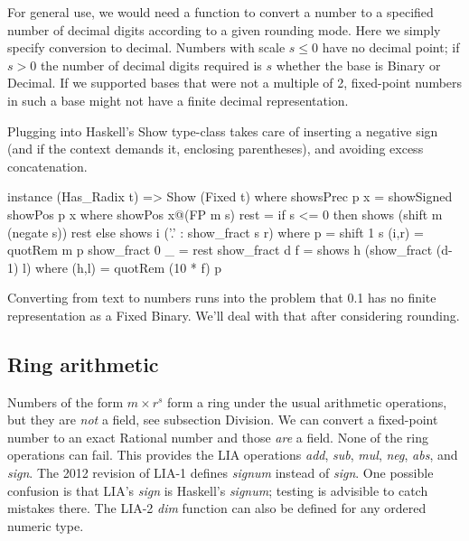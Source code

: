 \documentclass{article}
\begin{document}
For general use, we would need a function to convert a
number to a specified number of decimal digits according
to a given rounding mode.  Here we simply specify conversion
to decimal.  Numbers with scale $s \le 0$ have no decimal
point; if $s > 0$ the number of decimal digits required is
$s$ whether the base is Binary or Decimal.  If we supported
bases that were not a multiple of 2, fixed-point numbers in
such a base might not have a finite decimal representation.

Plugging into Haskell's Show type-class takes care of
inserting a negative sign (and if the context demands it,
enclosing parentheses), and avoiding excess concatenation.

\begin{code}
instance (Has_Radix t) => Show (Fixed t)
  where
    showsPrec p x = showSigned showPos p x
      where showPos x@(FP m s) rest =
              if s <= 0 then shows (shift m (negate s)) rest
              else shows i ('.' : show_fract s r)
              where p = shift 1 s
                    (i,r) = quotRem m p
                    show_fract 0 _ = rest
                    show_fract d f = shows h (show_fract (d-1) l)
                      where (h,l) = quotRem (10 * f) p
\end{code}

Converting from text to numbers runs into the problem that
0.1 has no finite representation as a Fixed Binary.
We'll deal with that after considering rounding.

\subsection{Ring arithmetic}

Numbers of the form $m\times r^s$ form a ring under the usual
arithmetic operations, but they are \emph{not} a field, see
subsection Division.
We can convert a fixed-point number to an exact Rational number and
those \emph{are} a field.  None of the ring operations can fail.
This provides the LIA operations {\it add}, {\it sub}, {\it mul},
{\it neg}, {\it abs}, and {\it sign}.  The 2012 revision of LIA-1
defines {\it signum} instead of {\it sign}.  One possible confusion
is that LIA's {\it sign} is Haskell's {\it signum}; testing is
advisible to catch mistakes there.  The LIA-2 {\it dim}
function can also be defined for any ordered numeric type.
\end{document}
